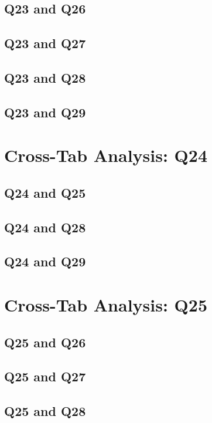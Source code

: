 \documentclass{report}
\begin{document}
\section{Q23 and Q26}\clearpage
\section{Q23 and Q27}\clearpage
\section{Q23 and Q28}\clearpage
\section{Q23 and Q29}\clearpage

\chapter{Cross-Tab Analysis: Q24}

\section{Q24 and Q25}\clearpage
\section{Q24 and Q28}\clearpage
\section{Q24 and Q29}\clearpage

\chapter{Cross-Tab Analysis: Q25}

\section{Q25 and Q26}\clearpage
\section{Q25 and Q27}\clearpage
\section{Q25 and Q28}\clearpage
\end{document}
